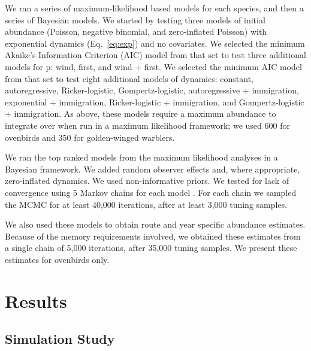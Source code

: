 \documentclass[12pt]{article}
\begin{document}
We ran a series of maximum-likelihood based models for each
species, and then a series of Bayesian models. We started by testing
three models of initial abundance (Poisson, negative binomial, and
zero-inflated Poisson) with exponential dynamics
(Eq.~\ref{eq:exp}) and no covariates.  We selected the minimum Akaike's Information
Criterion (AIC) model from that set to test three additional
models for p: wind, first, and wind + first. We selected the minimum
AIC model from that set to test eight additional models of dynamics:
constant, autoregressive, Ricker-logistic, Gompertz-logistic, autoregressive +
immigration, exponential + immigration, Ricker-logistic +
immigration, and Gompertz-logistic + immigration. %
As above, these models require a maximum abundance to integrate
over when run in a maximum likelihood
framework; we used 600 for ovenbirds and 350 for golden-winged warblers.

We ran the top ranked models from the maximum likelihood
analyses in a Bayesian framework.  We added random observer 
effects and, where appropriate, zero-inflated dynamics.  We used
non-informative priors. We tested for lack of convergence using
5 Markov chains for each model \citep{gelman_rubin:1992}.
For each chain we sampled the MCMC for at least 40,000 iterations, after at
least 3,000 tuning samples.  

We also used these models to obtain route and 
year specific abundance estimates.  Because of the memory requirements involved,
we obtained these estimates from a single chain of 5,000 iterations, after 35,000
tuning samples.  We present these estimates for ovenbirds only.

\section{Results}

\subsection{Simulation Study}
\end{document}
